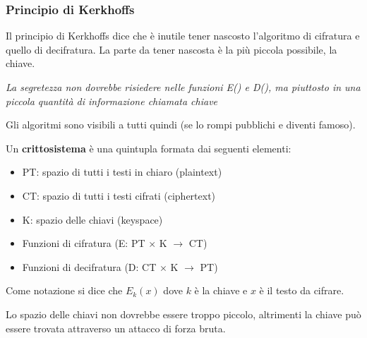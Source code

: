 \subsubsection*{Principio di Kerkhoffs}

Il principio di Kerkhoffs dice che è inutile tener nascosto l'algoritmo di cifratura e quello di decifratura. La parte da tener nascosta è la più piccola possibile, la chiave.

\begin{center}
	\textit{La segretezza non dovrebbe risiedere nelle funzioni E() e D(), ma piuttosto in una piccola quantità di informazione chiamata chiave}
\end{center}

Gli algoritmi sono visibili a tutti quindi (se lo rompi pubblichi e diventi famoso).

Un \textbf{crittosistema} è una quintupla formata dai seguenti elementi:

\begin{itemize}
	\item PT: spazio di tutti i testi in chiaro (plaintext)
	\item CT: spazio di tutti i testi cifrati (ciphertext)
	\item K: spazio delle chiavi (keyspace)
	\item Funzioni di cifratura (E: PT $\times$ K $\rightarrow$ CT)
	\item Funzioni di decifratura (D: CT $\times$ K $\rightarrow$ PT)
\end{itemize}

Come notazione si dice che $E_k(x)$ dove $k$ è la chiave e $x$ è il testo da cifrare.

Lo spazio delle chiavi non dovrebbe essere troppo piccolo, altrimenti la chiave può essere trovata attraverso un attacco di forza bruta.